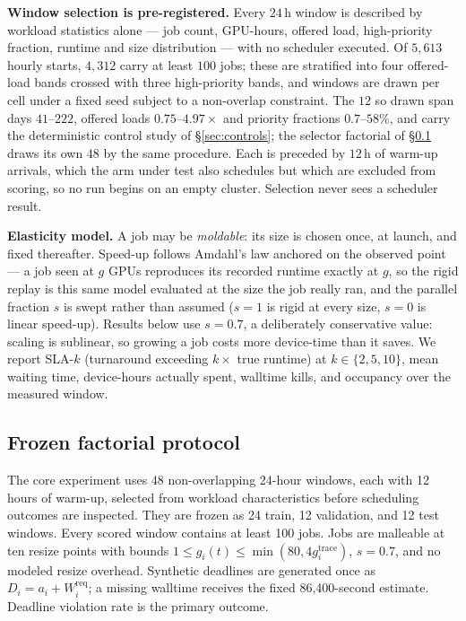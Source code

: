 \documentclass[conference]{IEEEtran}
\begin{document}
\textbf{Window selection is pre-registered.} Every $24$\,h window is described by workload statistics
alone --- job count, GPU-hours, offered load, high-priority fraction, runtime and size distribution ---
with no scheduler executed.  Of $5{,}613$ hourly starts, $4{,}312$ carry at least $100$ jobs; these are
stratified into four offered-load bands crossed with three high-priority bands, and windows are drawn
per cell under a fixed seed subject to a non-overlap constraint.  The $12$ so drawn span days
$41$--$222$, offered loads $0.75$--$4.97\times$ and priority fractions $0.7$--$58\%$, and carry the
deterministic control study of \S\ref{sec:controls}; the selector factorial of
\S\ref{sec:factorial-method} draws its own $48$ by the same procedure.  Each is preceded by $12$\,h of
warm-up arrivals, which the arm under test also schedules but which are excluded from scoring, so no
run begins on an empty cluster. Selection never sees a scheduler result.

\textbf{Elasticity model.} A job may be \emph{moldable}: its size is chosen once, at launch, and
fixed thereafter. Speed-up follows Amdahl's law anchored on the observed point --- a job seen at
$g$ GPUs reproduces its recorded runtime exactly at $g$, so the rigid replay is this same model
evaluated at the size the job really ran, and the parallel fraction $s$ is swept rather than
assumed ($s{=}1$ is rigid at every size, $s{=}0$ is linear speed-up). Results below use
$s{=}0.7$, a deliberately conservative value: scaling is sublinear, so growing a job costs more
device-time than it saves. We report SLA-$k$ (turnaround exceeding $k\times$ true runtime) at
$k \in \{2,5,10\}$, mean waiting time, device-hours actually spent, walltime kills, and
occupancy over the measured window.

\subsection{Frozen factorial protocol}
\label{sec:factorial-method}

The core experiment uses 48 non-overlapping 24-hour windows, each with 12 hours of warm-up,
selected from workload characteristics before scheduling outcomes are inspected.  They are frozen
as 24 train, 12 validation, and 12 test windows.  Every scored window contains at least 100 jobs.
Jobs are malleable at ten resize points with bounds
$1\leq g_i(t)\leq\min(80,4g_i^{\mathrm{trace}})$, $s=0.7$, and no modeled resize overhead.
Synthetic deadlines are generated once as
$D_i=a_i+W_i^{\mathrm{req}}$; a missing walltime receives the fixed 86,400-second estimate.
Deadline violation rate is the primary outcome.
\end{document}
